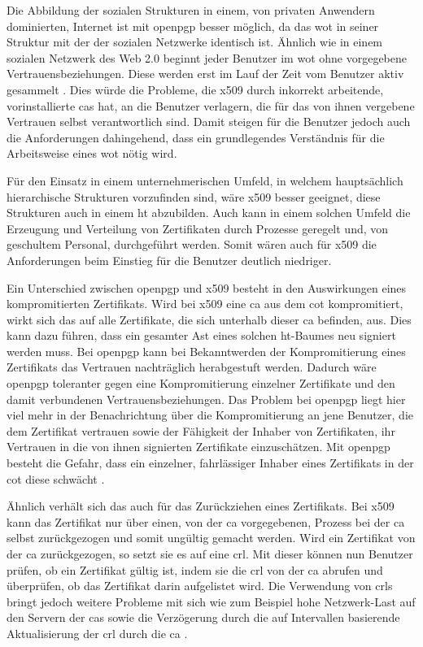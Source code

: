 Die Abbildung der sozialen Strukturen in einem, von privaten Anwendern dominierten, Internet ist mit \gls{openpgp} besser möglich, da das \gls{wot} in
seiner Struktur mit der der sozialen Netzwerke identisch ist. Ähnlich wie in einem sozialen Netzwerk des Web 2.0 beginnt jeder Benutzer im \gls{wot} ohne
vorgegebene Vertrauensbeziehungen. Diese werden erst im Lauf der Zeit vom Benutzer aktiv gesammelt \cite{pki:perlman}. Dies würde die Probleme, die \gls{x509}
durch inkorrekt arbeitende, vorinstallierte \glspl{ca} hat, an die Benutzer verlagern, die für das von ihnen vergebene Vertrauen selbst verantwortlich sind.
Damit steigen für die Benutzer jedoch auch die Anforderungen dahingehend, dass ein grundlegendes Verständnis für die Arbeitsweise eines \gls{wot} nötig wird.

Für den Einsatz in einem unternehmerischen Umfeld, in welchem hauptsächlich hierarchische Strukturen vorzufinden sind, wäre \gls{x509} besser geeignet,
diese Strukturen auch in einem \gls{ht} abzubilden. Auch kann in einem solchen Umfeld die Erzeugung und Verteilung von Zertifikaten durch Prozesse geregelt und,
von geschultem Personal, durchgeführt werden. Somit wären auch für \gls{x509} die Anforderungen beim Einstieg für die Benutzer deutlich niedriger.

Ein Unterschied zwischen \gls{openpgp} und \gls{x509} besteht in den Auswirkungen eines kompromitierten Zertifikats. Wird bei \gls{x509} eine \gls{ca} aus
dem \gls{cot} kompromitiert, wirkt sich das auf alle Zertifikate, die sich unterhalb dieser \gls{ca} befinden, aus. Dies kann dazu führen, dass ein gesamter Ast
eines solchen \gls{ht}-Baumes neu signiert werden muss. Bei \gls{openpgp} kann bei Bekanntwerden der Kompromitierung eines Zertifikats das Vertrauen nachträglich
herabgestuft werden\cite{pgp}. Dadurch wäre \gls{openpgp} toleranter gegen eine Kompromitierung einzelner Zertifikate und den damit verbundenen
Vertrauensbeziehungen. Das Problem bei \gls{openpgp} liegt hier viel mehr in der Benachrichtung über die Kompromitierung an jene Benutzer, die dem Zertifikat
vertrauen sowie der Fähigkeit der Inhaber von Zertifikaten, ihr Vertrauen  in die von ihnen signierten Zertifikate einzuschätzen. Mit \gls{openpgp} besteht die
Gefahr, dass ein einzelner, fahrlässiger Inhaber eines Zertifikats in der \gls{cot} diese schwächt \cite{pki:perlman}.

Ähnlich verhält sich das auch für das Zurückziehen eines Zertifikats. Bei \gls{x509} kann das Zertifikat nur über einen, von der \gls{ca} vorgegebenen, Prozess
bei der \gls{ca} selbst zurückgezogen und somit ungültig gemacht werden. Wird ein Zertifikat von der \gls{ca} zurückgezogen, so setzt sie es auf eine
\gls{crl}. Mit dieser können nun Benutzer prüfen, ob ein Zertifikat gültig ist, indem sie die \gls{crl} von der \gls{ca} abrufen und überprüfen, ob das
Zertifikat darin aufgelistet wird. Die Verwendung von \glspl{crl} bringt jedoch weitere Probleme mit sich wie zum Beispiel hohe Netzwerk-Last auf den Servern
der \glspl{ca} sowie die Verzögerung durch die auf Intervallen basierende Aktualisierung der \gls{crl} durch die \gls{ca} \cite{10.1109/MC.2002.1023787}. 

